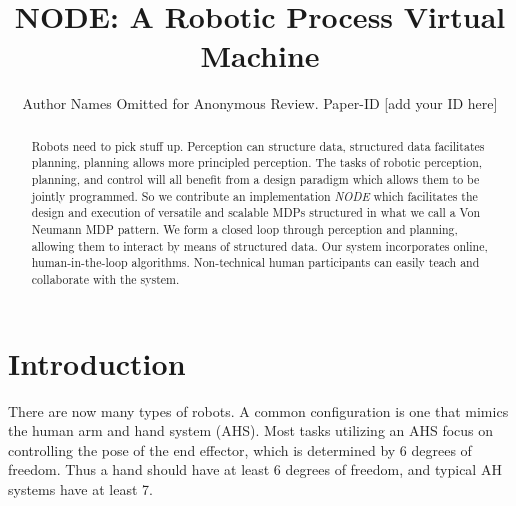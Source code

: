\documentclass[conference]{IEEEtran}
\begin{document}


\title{NODE: A Robotic Process Virtual Machine}
\author{Author Names Omitted for Anonymous Review. Paper-ID [add your ID here]}

\maketitle


\begin{abstract}
Robots need to pick stuff up.
%
Perception can structure data, structured data facilitates planning, planning allows more principled perception.
%
The tasks of robotic perception, planning, and control will all benefit from
a design paradigm which allows them to be jointly programmed.
%
So we contribute an implementation \emph{NODE} which facilitates the design and 
execution of versatile and scalable MDPs structured in what we call a
Von Neumann MDP pattern. 
%
We form a closed loop through perception and planning, allowing them to interact by means of structured data.
%
Our system incorporates online, human-in-the-loop algorithms. Non-technical human participants can easily
teach and collaborate with the system.
\end{abstract}


\section{Introduction}


There are now many types of robots. A common configuration is one that mimics
the human arm and hand system (AHS).  Most tasks utilizing an AHS focus on controlling the
pose of the end effector, which is determined by 6 degrees of freedom.  Thus a hand should have 
at least 6 degrees of freedom, and typical AH systems have at least 7.
\end{document}
